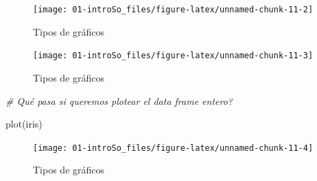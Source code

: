 \documentclass[
]{book}
\newenvironment{Shaded}{\begin{snugshade}}{\end{snugshade}}
\newcommand{\AttributeTok}[1]{\textcolor[rgb]{0.77,0.63,0.00}{#1}}
\newcommand{\CommentTok}[1]{\textcolor[rgb]{0.56,0.35,0.01}{\textit{#1}}}
\newcommand{\DecValTok}[1]{\textcolor[rgb]{0.00,0.00,0.81}{#1}}
\newcommand{\FunctionTok}[1]{\textcolor[rgb]{0.00,0.00,0.00}{#1}}
\newcommand{\NormalTok}[1]{#1}
\newcommand{\SpecialCharTok}[1]{\textcolor[rgb]{0.00,0.00,0.00}{#1}}
\newcommand{\StringTok}[1]{\textcolor[rgb]{0.31,0.60,0.02}{#1}}
\begin{document}
\begin{Shaded}
\end{Shaded}

\begin{figure}

{\centering \texttt{[image: 01-introSo\_files/figure-latex/unnamed-chunk-11-2]} 

}

\caption{Tipos de gráficos}\label{fig:unnamed-chunk-11-2}
\end{figure}

\begin{Shaded}
\end{Shaded}

\begin{figure}

{\centering \texttt{[image: 01-introSo\_files/figure-latex/unnamed-chunk-11-3]} 

}

\caption{Tipos de gráficos}\label{fig:unnamed-chunk-11-3}
\end{figure}

\begin{Shaded}
\begin{Highlighting}[]
\CommentTok{\# Qué pasa si queremos plotear el data frame entero? }

\FunctionTok{plot}\NormalTok{(iris)}
\end{Highlighting}
\end{Shaded}

\begin{figure}

{\centering \texttt{[image: 01-introSo\_files/figure-latex/unnamed-chunk-11-4]} 

}

\caption{Tipos de gráficos}\label{fig:unnamed-chunk-11-4}
\end{figure}
\end{document}
